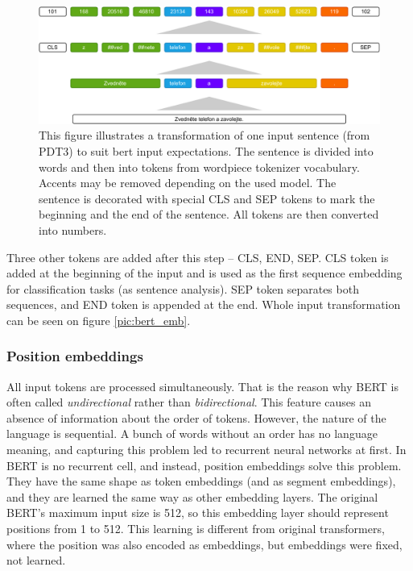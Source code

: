 \begin{figure}[h]
\centering
\includegraphics[width=1\columnwidth]{../img/bert_input}
\protect\caption{This figure illustrates a transformation of one input sentence (from PDT3) to suit bert input expectations. The sentence is divided into words and then into tokens from wordpiece tokenizer vocabulary. Accents may be removed depending on the used model. The sentence is decorated with special CLS and SEP tokens to mark the beginning and the end of the sentence. All tokens are then converted into numbers. }
\label{pic:bert_inp}
\end{figure}


\par
Three other tokens are added after this step -- CLS, END, SEP. 
CLS token is added at the beginning of the input and is used as the first sequence embedding for classification tasks (as sentence analysis). SEP token separates both sequences, and END token is appended at the end. Whole input transformation can be seen on figure \ref{pic:bert_emb}. %

\subsubsection*{Position embeddings}
All input tokens are processed simultaneously. That is the reason why BERT is often called \textit{undirectional} rather than \textit{bidirectional}. This feature causes an absence of information about the order of tokens. However, the nature of the language is sequential. A bunch of words without an order has no language meaning, and capturing this problem led to recurrent neural networks at first. In BERT is no recurrent cell, and instead, position embeddings solve this problem. They have the same shape as token embeddings (and as segment embeddings), and they are learned the same way as other embedding layers. The original BERT's maximum input size is 512, so this embedding layer should represent positions from 1 to 512. This learning is different from original transformers, where the position was also encoded as embeddings, but embeddings were fixed, not learned.

